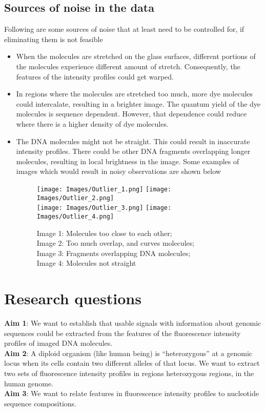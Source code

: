 \subsection{Sources of noise in the data} \label{sec_noise}
Following are some sources of noise that at least need to be controlled for, if eliminating them is not feasible
\begin{itemize}
\item When the molecules are stretched on the glass surfaces, different portions of the molecules experience different amount of stretch. Consequently, the features of the intensity profiles could get warped. 
\item In regions where the molecules are stretched too much, more dye molecules could intercalate, resulting in a brighter image. The quantum yield of the dye molecules is sequence dependent. However, that dependence could reduce where there is a higher density of dye molecules. 
\item The DNA molecules might not be straight. This could result in inaccurate intensity profiles. There could be other DNA fragments overlapping longer molecules, resulting in local brightness in the image. Some examples of images which would result in noisy observations are shown below
\begin{figure}[H]
\begin{center}
\texttt{[image: Images/Outlier\_1.png]}
\texttt{[image: Images/Outlier\_2.png]} \\
\texttt{[image: Images/Outlier\_3.png]}
\texttt{[image: Images/Outlier\_4.png]}
\end{center}
\caption{Image 1: Molecules too close to each other; \\ Image 2: Too much overlap, and curves molecules; \\Image 3: Fragments overlapping DNA molecules; \\Image 4: Molecules not straight}
\label{fig:Fig2_OutlierImages}
\end{figure}

\end{itemize}

\section{Research questions}
\noindent
{\bf{Aim 1}}: We want to establish that usable signals with information about genomic sequences could be extracted from the features of the fluorescence intensity profiles of imaged DNA molecules. \\
\noindent
{\bf{Aim 2}}: A diploid organism (like human being) is ``heterozygous'' at a genomic locus when its cells contain two different alleles of that locus. We want to extract two sets of fluorescence intensity profiles in regions heterozygous regions, in the human genome. \\
\noindent
{\bf{Aim 3}}: We want to relate features in fluorescence intensity profiles to nucleotide sequence compositions. \\


